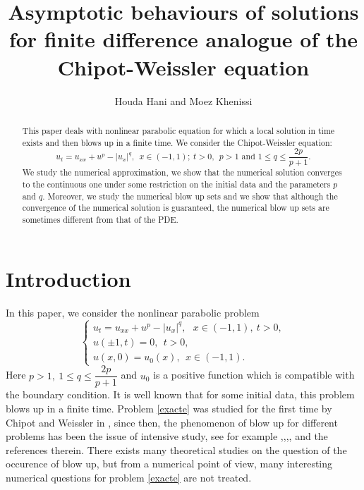 \documentclass[a4paper,12pt,english,reqno]{smfart}
\author[H.Hani and M. Khenissi]{Houda Hani and Moez Khenissi}
\title[\textbf{Asymptotic behaviours}]{Asymptotic behaviours of solutions for finite difference analogue of the Chipot-Weissler equation}
\begin{document}
	\frontmatter
	\begin{abstract}
		This paper deals with nonlinear parabolic equation for which a local solution in time exists and then blows up in a finite time. We consider the Chipot-Weissler equation:
		\begin{equation*}
		u_{t}=u_{xx}+u^{p}-\left|u_{x}\right|^{q},\ \ x\in (-1,1);\ t>0, \ \ p>1 \text{ and } 1\leq q\leq \dfrac{2p}{p+1}.
		\end{equation*}
		We study the numerical approximation, we show that the numerical solution converges to the continuous one under some restriction on the initial data and the parameters $p$ and $q$. Moreover, we study the numerical blow up sets and we show that although the convergence of the numerical solution is guaranteed, the numerical blow up sets are sometimes different from that of the PDE. 
	\end{abstract}
	\frontmatter
	\maketitle
	\mainmatter\date{}
	\tableofcontents
	\section{Introduction}
	In this paper, we consider the nonlinear parabolic problem
	\begin{equation}
	\left\{
	\begin{array}{lll}
	u_{t}=u_{xx}+u^{p}-\left|u_{x}\right|^{q},\ \ \ x\in (-1,1),\ t>0,\\
	u(\pm 1,t)=0,\ \ t>0,\\
	u(x,0)=u_{0}(x),\ \ x\in(-1,1).	
	\end{array}
	\right.
	\label{exacte}
	\end{equation}
	Here $p>1,\ 1\leq q\leq \dfrac{2p}{p+1}$ and $u_{0}$ is a positive function which is compatible with the boundary condition. It is well known that for some initial data, this problem blows up in a finite time. Problem \eqref{exacte} was studied for the first time by Chipot and Weissler in \cite{chipotweissler}, since then, the phenomenon of blow up for different problems has been the issue of intensive study, see for example \cite{friedman},\cite{fujita},\cite{hayakawa},\cite{levine},\cite{souplet} and the references therein. There exists many theoretical studies on the question of the occurence of blow up, but from a numerical point of view, many interesting numerical questions for problem \eqref{exacte} are not treated.\\
	
\end{document}
